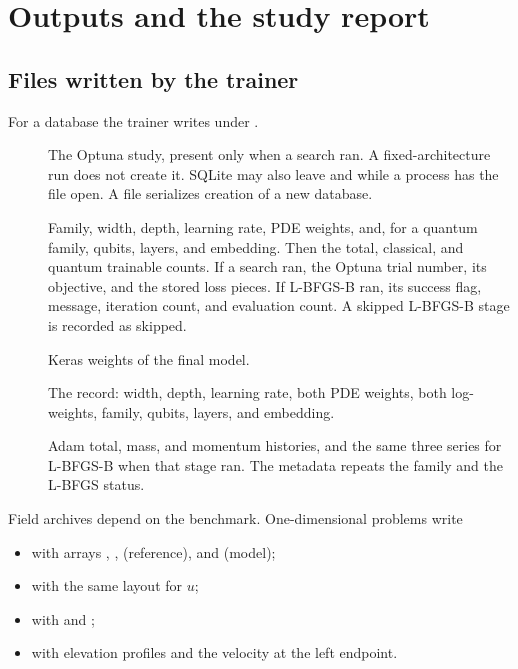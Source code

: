 \chapter{Outputs and the study report}
\label{ch:outputs}

\section{Files written by the trainer}

For a database  the trainer writes under .

\begin{description}
\item[]
The Optuna study, present only when a search ran.
A fixed-architecture run does not create it.
SQLite may also leave  and  while a process has the file open.
A  file serializes creation of a new database.

\item[]
Family, width, depth, learning rate, PDE weights, and, for a quantum family, qubits, layers, and embedding.
Then the total, classical, and quantum trainable counts.
If a search ran, the Optuna trial number, its objective, and the stored loss pieces.
If L-BFGS-B ran, its success flag, message, iteration count, and evaluation count.
A skipped L-BFGS-B stage is recorded as skipped.

\item[]
Keras weights of the final model.

\item[]
The  record: width, depth, learning rate, both PDE weights, both log-weights, family, qubits, layers, and embedding.

\item[]
Adam total, mass, and momentum histories, and the same three series for L-BFGS-B when that stage ran.
The metadata repeats the family and the L-BFGS status.
\end{description}

Field archives depend on the benchmark.
One-dimensional problems write

\begin{itemize}
\item {} with arrays , ,  (reference), and  (model);
\item {} with the same layout for \(u\);
\item {} with  and ;
\item {} with elevation profiles and the velocity at the left endpoint.
\end{itemize}

